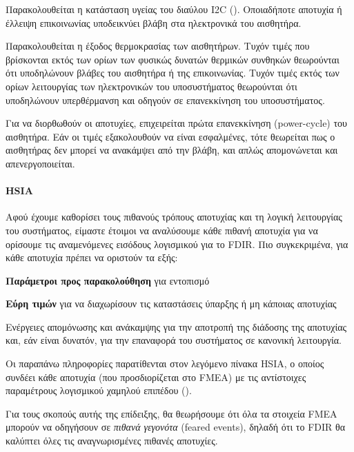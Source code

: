 \documentclass[a4paper,nobib]{tufte-book}
\begin{document}
\begin{compactenum}
	\item Παρακολουθείται η κατάσταση υγείας του διαύλου \ac{I2C} (). Οποιαδήποτε αποτυχία ή έλλειψη επικοινωνίας υποδεικνύει βλάβη στα ηλεκτρονικά του αισθητήρα.
	\item Παρακολουθείται η έξοδος θερμοκρασίας των αισθητήρων. Τυχόν τιμές που βρίσκονται εκτός των ορίων των φυσικώς δυνατών θερμικών συνθηκών θεωρούνται ότι υποδηλώνουν βλάβες του αισθητήρα ή της επικοινωνίας. Τυχόν τιμές εκτός των ορίων λειτουργίας των ηλεκτρονικών του υποσυστήματος θεωρούνται ότι υποδηλώνουν υπερθέρμανση και οδηγούν σε επανεκκίνηση του υποσυστήματος.
	\item Για να διορθωθούν οι αποτυχίες, επιχειρείται πρώτα επανεκκίνηση (power-cycle) του αισθητήρα. Εάν οι τιμές εξακολουθούν να είναι εσφαλμένες, τότε θεωρείται πως ο αισθητήρας δεν μπορεί να ανακάμψει από την βλάβη, και απλώς απομονώνεται και απενεργοποιείται.
\end{compactenum}

\paragraph{\acl{HSIA}}

Αφού έχουμε καθορίσει τους πιθανούς τρόπους αποτυχίας και τη λογική λειτουργίας του συστήματος, είμαστε έτοιμοι να αναλύσουμε κάθε πιθανή αποτυχία για να ορίσουμε τις αναμενόμενες εισόδους λογισμικού για το \ac{FDIR}. Πιο συγκεκριμένα, για κάθε αποτυχία πρέπει να οριστούν τα εξής: \autocite[84]{SAVOIR-HB-003}
\begin{compactitem}
	\item \textbf{Παράμετροι προς παρακολούθηση} για εντοπισμό
	\item \textbf{Εύρη τιμών} για να διαχωρίσουν τις καταστάσεις ύπαρξης ή μη κάποιας αποτυχίας
	\item Ενέργειες απομόνωσης και ανάκαμψης για την αποτροπή της διάδοσης της αποτυχίας και, εάν είναι δυνατόν, για την επαναφορά του συστήματος σε κανονική λειτουργία.
\end{compactitem}

Οι παραπάνω πληροφορίες παρατίθενται στον λεγόμενο πίνακα \acf{HSIA}, ο οποίος συνδέει κάθε αποτυχία (που προσδιορίζεται στο \acl{FMEA}) με τις αντίστοιχες παραμέτρους λογισμικού χαμηλού επιπέδου ().

Για τους σκοπούς αυτής της επίδειξης, θα θεωρήσουμε ότι όλα τα στοιχεία \ac{FMEA} μπορούν να οδηγήσουν σε \emph{πιθανά γεγονότα} (feared events), δηλαδή ότι το \ac{FDIR} θα καλύπτει όλες τις αναγνωρισμένες πιθανές αποτυχίες.
\end{document}
